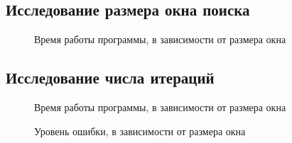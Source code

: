 \subsection{Исследование размера окна поиска}
\begin{figure}[h!]
\caption{Время работы программы, в зависимости от размера окна}
\label{pic:window_time}
\end{figure}

\subsection{Исследование числа итераций}
\begin{figure}[h!]
\caption{Время работы программы, в зависимости от размера окна}
\label{pic:window_iter}
\end{figure}

\begin{figure}[h!]
\caption{Уровень ошибки, в зависимости от размера окна}
\label{pic:window_size}
\end{figure}

